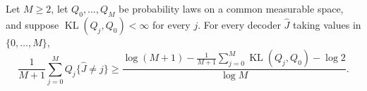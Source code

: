 Let \(M\ge2\), let \(Q_0,\ldots,Q_M\) be probability laws on a common measurable space, and suppose \(\operatorname{KL}(Q_j,Q_0)<\infty\) for every \(j\). For every decoder \(\widehat J\) taking values in \(\{0,\ldots,M\}\),
\[
 \frac1{M+1}\sum_{j=0}^M Q_j\{\widehat J\ne j\}
 \ge
 \frac{\log(M+1)-\frac1{M+1}\sum_{j=0}^M\operatorname{KL}(Q_j,Q_0)-\log2}{\log M}.
\]